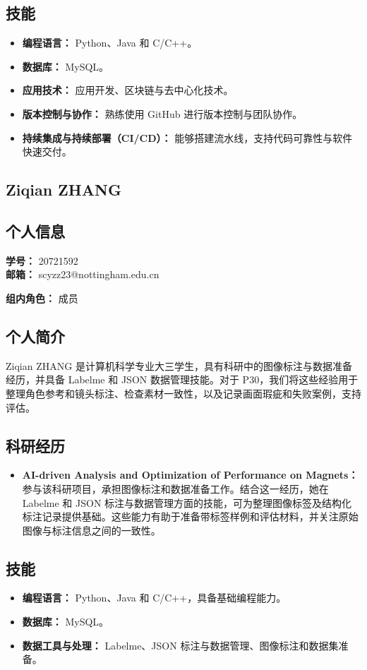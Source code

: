 \documentclass[a4paper,12pt]{article}
\newcommand{\PersonalInformation}[2]{%
  \subsection*{个人信息}
  \if\relax\detokenize{#1}\relax\else
  \noindent\textbf{学号：} #1\\
  \fi
  \textbf{邮箱：} #2\par
}
\begin{document}
\subsection*{技能}
\begin{itemize}
  \item \textbf{编程语言：} Python、Java 和 C/C++。
  \item \textbf{数据库：} MySQL。
  \item \textbf{应用技术：} 应用开发、区块链与去中心化技术。
  \item \textbf{版本控制与协作：} 熟练使用 GitHub 进行版本控制与团队协作。
  \item \textbf{持续集成与持续部署（CI/CD）：} 能够搭建流水线，支持代码可靠性与软件快速交付。
\end{itemize}

\subsection{Ziqian ZHANG}
\PersonalInformation{20721592}{scyzz23@nottingham.edu.cn}
\noindent\textbf{组内角色：} 成员\par

\subsection*{个人简介}
Ziqian ZHANG 是计算机科学专业大三学生，具有科研中的图像标注与数据准备经历，并具备 Labelme 和 JSON 数据管理技能。对于 P30，我们将这些经验用于整理角色参考和镜头标注、检查素材一致性，以及记录画面瑕疵和失败案例，支持评估。

\subsection*{科研经历}
\begin{itemize}
  \item \textbf{AI-driven Analysis and Optimization of Performance on Magnets：} 参与该科研项目，承担图像标注和数据准备工作。结合这一经历，她在 Labelme 和 JSON 标注与数据管理方面的技能，可为整理图像标签及结构化标注记录提供基础。这些能力有助于准备带标签样例和评估材料，并关注原始图像与标注信息之间的一致性。
\end{itemize}

\subsection*{技能}
\begin{itemize}
  \item \textbf{编程语言：} Python、Java 和 C/C++，具备基础编程能力。
  \item \textbf{数据库：} MySQL。
  \item \textbf{数据工具与处理：} Labelme、JSON 标注与数据管理、图像标注和数据集准备。
\end{itemize}
\end{document}
